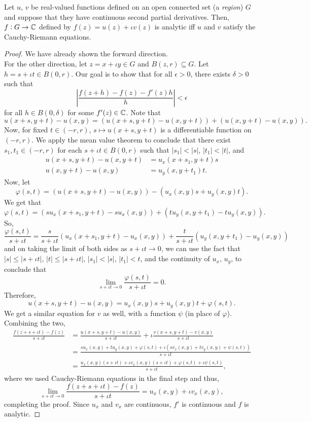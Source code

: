 	\begin{ftheo}
		Let $u$, $v$ be real-valued functions defined on an open connected set (a \emph{region}) $G$ and suppose that they have continuous second partial derivatives. Then, $f:G\to\mathbb{C}$ defined by $f(z) = u(z) + \iota v(z)$ is analytic iff $u$ and $v$ satisfy the Cauchy-Riemann equations.
	\end{ftheo}
	\begin{proof}
		We have already shown the forward direction.\\
		For the other direction, let $z = x + \iota y \in G$ and $B(z,r) \subseteq G$. Let $h = s + \iota t \in B(0,r)$. Our goal is to show that for all $\epsilon > 0$, there exists $\delta > 0$ such that
		\[ \left| \frac{f(z+h) - f(z) - f'(z)h}{h} \right| < \epsilon \]
		for all $h \in B(0,\delta)$ for some $f'(z) \in \mathbb{C}$.
		Note that
		\[ u(x+s,y+t) - u(x,y) = \left( u(x+s,y+t) - u(x,y+t) \right) + \left( u(x,y+t) - u(x,y) \right). \]
		Now, for fixed $t \in (-r,r)$, $s \mapsto u(x+s,y+t)$ is a differentiable function on $(-r,r)$. We apply the mean value theorem to conclude that there exist $s_1,t_1 \in (-r,r)$ for each $s+\iota t \in B(0,r)$ such that $|s_1| < |s|$, $|t_1| < |t|$, and
		\begin{align*}
			u(x+s,y+t) - u(x,y+t) &= u_x(x+s_1,y+t)s \\
			u(x,y+t) - u(x,y) &= u_y(x,y+t_1)t.
		\end{align*}
		Now, let
		\[ \varphi(s,t) = \left( u(x+s,y+t) - u(x,y) \right) - \left( u_x(x,y)s + u_y(x,y)t \right). \]
		We get that
		\[ \varphi(s,t) = \left(s u_x(x+s_1,y+t) - s u_x(x,y)\right) + \left(t u_y(x,y+t_1) - t u_y(x,y)\right). \]
		So,
		\[ \frac{\varphi(s,t)}{s+\iota t} = \frac{s}{s+\iota t} \left(u_x(x+s_1,y+t) - u_x(x,y)\right) + \frac{t}{s+\iota t} \left(u_y(x,y+t_1) - u_y(x,y)\right) \]
		and on taking the limit of both sides as $s+\iota t \to 0$, we can use the fact that $|s| \le |s+\iota t|$, $|t| \le |s+\iota t|$, $|s_1| < |s|$, $|t_1| < t$, and the continuity of $u_x$, $u_y$, to conclude that
		\[ \lim_{s+\iota t \to 0} \frac{\varphi(s,t)}{s+\iota t} = 0. \]
		Therefore,
		\[ u(x+s,y+t) - u(x,y) = u_x(x,y)s + u_y(x,y) t + \varphi(s,t). \]
		We get a similar equation for $v$ as well, with a function $\psi$ (in place of $\varphi$). Combining the two,
		\begin{align*}
			\frac{f(z+s+\iota t) - f(z)}{s+\iota t} &= \frac{u(x+s,y+t)-u(x,y)}{s+\iota t} + \iota \frac{v(x+s,y+t) - v(x,y)}{s+\iota t} \\
				&= \frac{s u_x(x,y) + t u_y(x,y) + \varphi(s,t) + \iota \left( s v_x(x,y) + t v_y(x,y) + \psi(s,t) \right)}{s+\iota t} \\
				&= \frac{u_x(x,y) (s+\iota t) + \iota v_x(x,y) (s+\iota t) + \varphi(s,t) + \iota \psi(s,t)}{s+\iota t},
		\end{align*}
		where we used Cauchy-Riemann equations in the final step and thus,
		\[ \lim_{s+\iota t \to 0} \frac{f(z+s+\iota t) - f(z)}{s+\iota t} = u_x(x,y) + \iota v_x(x,y), \]
		completing the proof. Since $u_x$ and $v_x$ are continuous, $f'$ is continuous and $f$ is analytic.
	\end{proof}

